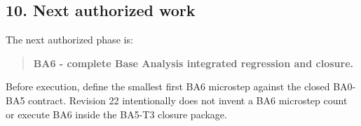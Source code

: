 \documentclass[
  10pt,
  a4paper,
]{article}
\begin{document}
\subsection{10. Next authorized work}\label{10-next-authorized-work}

The next authorized phase is:

\begin{quote}
\textbf{BA6 - complete Base Analysis integrated regression and closure.}
\end{quote}

Before execution, define the smallest first BA6 microstep against the
closed BA0-BA5 contract. Revision 22 intentionally does not invent a BA6
microstep count or execute BA6 inside the BA5-T3 closure package.
\end{document}
